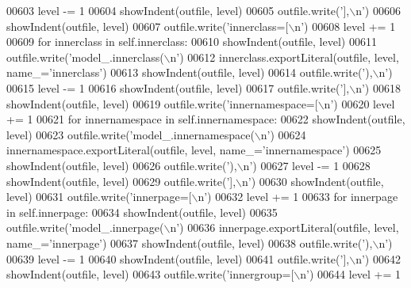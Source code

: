\begin{DoxyCode}
{{{{{{{{{{{{{{{{{{{{{{{{{{{{{{{{{{{00603         level -= 1
00604         showIndent(outfile, level)
00605         outfile.write(\textcolor{stringliteral}{'],\(\backslash\)n'})
00606         showIndent(outfile, level)
00607         outfile.write(\textcolor{stringliteral}{'innerclass=[\(\backslash\)n'})
00608         level += 1
00609         \textcolor{keywordflow}{for} innerclass \textcolor{keywordflow}{in} self.innerclass:
00610             showIndent(outfile, level)
00611             outfile.write(\textcolor{stringliteral}{'model\_.innerclass(\(\backslash\)n'})
00612             innerclass.exportLiteral(outfile, level, name\_=\textcolor{stringliteral}{'innerclass'})
00613             showIndent(outfile, level)
00614             outfile.write(\textcolor{stringliteral}{'),\(\backslash\)n'})
00615         level -= 1
00616         showIndent(outfile, level)
00617         outfile.write(\textcolor{stringliteral}{'],\(\backslash\)n'})
00618         showIndent(outfile, level)
00619         outfile.write(\textcolor{stringliteral}{'innernamespace=[\(\backslash\)n'})
00620         level += 1
00621         \textcolor{keywordflow}{for} innernamespace \textcolor{keywordflow}{in} self.innernamespace:
00622             showIndent(outfile, level)
00623             outfile.write(\textcolor{stringliteral}{'model\_.innernamespace(\(\backslash\)n'})
00624             innernamespace.exportLiteral(outfile, level, name\_=\textcolor{stringliteral}{'innernamespace'})
00625             showIndent(outfile, level)
00626             outfile.write(\textcolor{stringliteral}{'),\(\backslash\)n'})
00627         level -= 1
00628         showIndent(outfile, level)
00629         outfile.write(\textcolor{stringliteral}{'],\(\backslash\)n'})
00630         showIndent(outfile, level)
00631         outfile.write(\textcolor{stringliteral}{'innerpage=[\(\backslash\)n'})
00632         level += 1
00633         \textcolor{keywordflow}{for} innerpage \textcolor{keywordflow}{in} self.innerpage:
00634             showIndent(outfile, level)
00635             outfile.write(\textcolor{stringliteral}{'model\_.innerpage(\(\backslash\)n'})
00636             innerpage.exportLiteral(outfile, level, name\_=\textcolor{stringliteral}{'innerpage'})
00637             showIndent(outfile, level)
00638             outfile.write(\textcolor{stringliteral}{'),\(\backslash\)n'})
00639         level -= 1
00640         showIndent(outfile, level)
00641         outfile.write(\textcolor{stringliteral}{'],\(\backslash\)n'})
00642         showIndent(outfile, level)
00643         outfile.write(\textcolor{stringliteral}{'innergroup=[\(\backslash\)n'})
00644         level += 1
}}}}}}}}}}}}}}}}}}}}}}}}}}}}}}}}}}}
\end{DoxyCode}
